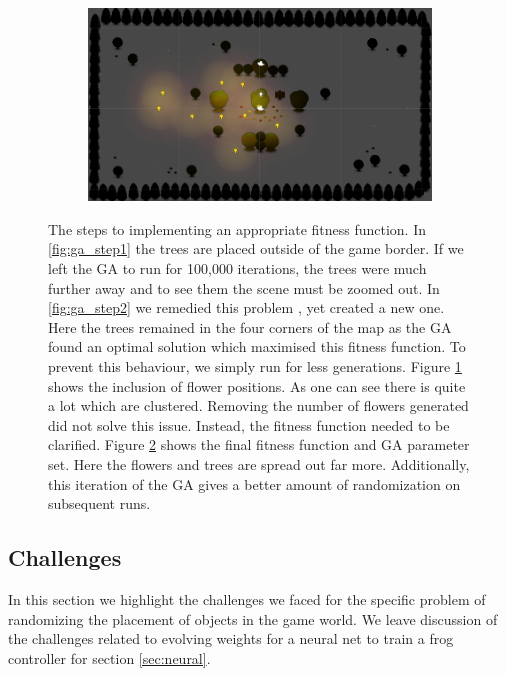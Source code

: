 \begin{figure}[h]
\begin{subfigure}[b]{0.5\linewidth}
                \caption{}
                \label{fig:ga_step3}
        \end{subfigure}
        \begin{subfigure}[b]{0.49\linewidth}
               \includegraphics[width=\linewidth]{./ga_final}
           	   \caption{}
               \label{fig:ga_step4}
        \end{subfigure}
        \caption{The steps to implementing an appropriate fitness function. In \ref{fig:ga_step1} the trees are placed 
        outside of the game border. If we left the GA to run for 100,000 iterations, the trees were much further away and 
        to see them the scene must be zoomed out. In \ref{fig:ga_step2} we remedied this problem , yet created a new one. 
        Here the trees remained in the four corners of the map as the GA found an optimal solution which maximised this 
        fitness function. To prevent this behaviour, we simply run for less generations. Figure \ref{fig:ga_step3} shows 
        the inclusion of flower positions. As one can see there is quite a lot which are clustered. Removing the number of flowers generated did not solve this issue. Instead, the fitness function needed to be clarified. Figure 
        \ref{fig:ga_step4} shows the final fitness function and GA parameter set. Here the flowers and trees are spread out 
        far more. Additionally, this iteration of the GA gives a better amount of randomization on subsequent 
        runs.}
        \label{fig:GA_Trees}
\end{figure}


\subsection{Challenges}
In this section we highlight the challenges we faced for the specific problem of randomizing
the placement of objects in the game world. We leave discussion of the challenges related to evolving weights
for a neural net to train a frog controller for section \ref{sec:neural}.
